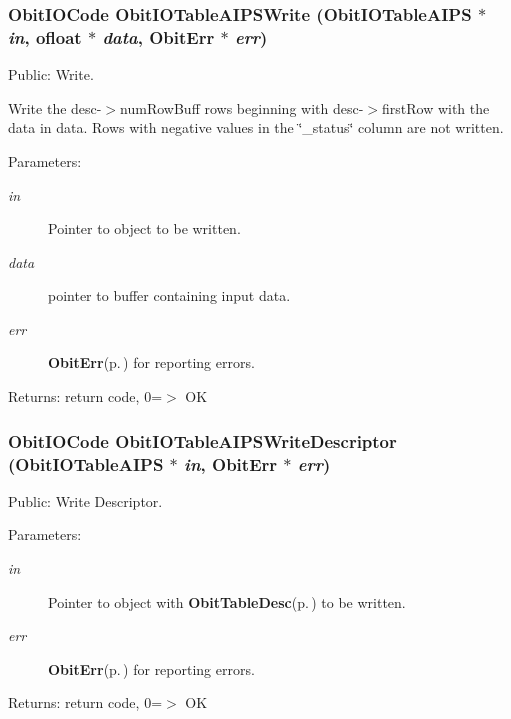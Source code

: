 \subsubsection{\setlength{\rightskip}{0pt plus 5cm}Obit\-IOCode Obit\-IOTable\-AIPSWrite ({\bf Obit\-IOTable\-AIPS} $\ast$ {\em in}, {\bf ofloat} $\ast$ {\em data}, {\bf Obit\-Err} $\ast$ {\em err})}\label{ObitIOTableAIPS_8h_a14}


Public: Write. 

Write the desc-$>$num\-Row\-Buff rows beginning with desc-$>$first\-Row with the data in data. Rows with negative values in the \char`\"{}\_\-status\char`\"{} column are not written. \begin{Desc}
\item[Parameters:]
\begin{description}
\item[{\em in}]Pointer to object to be written. \item[{\em data}]pointer to buffer containing input data. \item[{\em err}]{\bf Obit\-Err}{\rm (p.\,\pageref{structObitErr})} for reporting errors. \end{description}
\end{Desc}
\begin{Desc}
\item[Returns:]return code, 0=$>$ OK \end{Desc}
\subsubsection{\setlength{\rightskip}{0pt plus 5cm}Obit\-IOCode Obit\-IOTable\-AIPSWrite\-Descriptor ({\bf Obit\-IOTable\-AIPS} $\ast$ {\em in}, {\bf Obit\-Err} $\ast$ {\em err})}\label{ObitIOTableAIPS_8h_a18}


Public: Write Descriptor. 

\begin{Desc}
\item[Parameters:]
\begin{description}
\item[{\em in}]Pointer to object with {\bf Obit\-Table\-Desc}{\rm (p.\,\pageref{structObitTableDesc})} to be written. \item[{\em err}]{\bf Obit\-Err}{\rm (p.\,\pageref{structObitErr})} for reporting errors. \end{description}
\end{Desc}
\begin{Desc}
\item[Returns:]return code, 0=$>$ OK \end{Desc}
